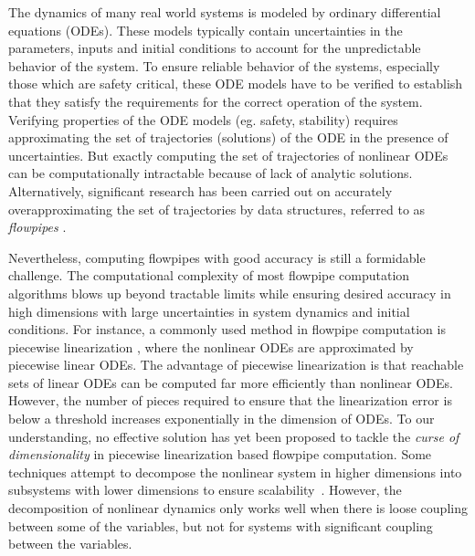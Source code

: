 The dynamics of many real world systems is modeled by ordinary
differential equations (ODEs).  These models typically contain
uncertainties in the parameters, inputs and initial conditions to
account for the unpredictable behavior of the system.  To ensure
reliable behavior of the systems, especially those which are safety
critical, these ODE models have to be verified to establish that they satisfy the
requirements for the correct operation of the system.  Verifying properties of
the ODE models (eg. safety, stability) requires approximating the set
of trajectories (solutions) of the ODE in the presence of
uncertainties.  But exactly computing the set of trajectories of
nonlinear ODEs can be computationally intractable because of lack of
analytic solutions.  Alternatively, significant research has been carried out on
accurately overapproximating the set of trajectories by data
structures, referred to as \emph{flowpipes} .

Nevertheless, computing flowpipes with good accuracy is still a
formidable challenge.  The computational complexity of most flowpipe
computation algorithms  blows up beyond tractable limits while ensuring
desired accuracy in high dimensions with large uncertainties in system
dynamics and initial conditions.  For instance, a commonly used method
in flowpipe computation is piecewise linearization , where the
nonlinear ODEs are approximated by piecewise linear ODEs.  The
advantage of piecewise linearization is that reachable sets of linear
ODEs can be computed far more efficiently than nonlinear ODEs.
However, the number of pieces required to ensure that the
linearization error is below a threshold increases exponentially in the
dimension of ODEs.  To our understanding, no effective solution has
yet been proposed to tackle the \emph{curse of dimensionality} in
piecewise linearization based flowpipe computation.  Some techniques
attempt to decompose the nonlinear system in higher dimensions into subsystems with
lower dimensions to ensure
scalability~\cite{chen2018decomposition,chen2016decomposed}.
However, the decomposition of nonlinear dynamics only works well when there
is loose coupling between some of the variables, but not for
systems with significant coupling between the variables.

